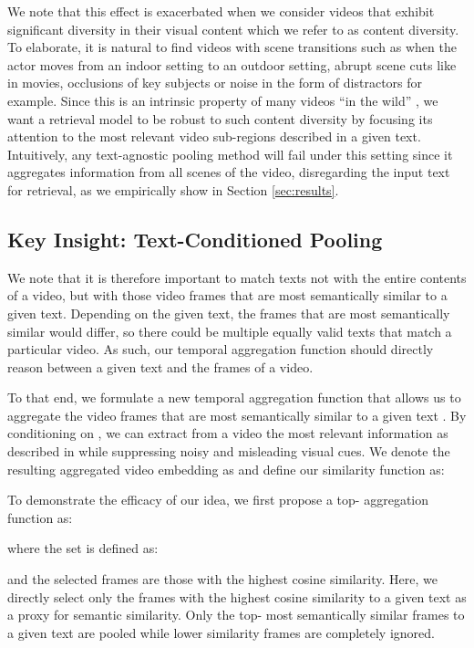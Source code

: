 \documentclass[10pt,twocolumn,letterpaper]{article}
\begin{document}
We note that this effect is exacerbated when we consider videos that exhibit significant diversity in their visual content \cite{liu2009recognizing} which we refer to as content diversity. To elaborate, it is natural to find videos with scene transitions such as when the actor moves from an indoor setting to an outdoor setting, abrupt scene cuts like in movies, occlusions of key subjects or noise in the form of distractors for example. Since this is an intrinsic property of many videos ``in the wild'' \cite{soomro2012ucf101, li2019quality}, we want a retrieval model to be robust to such content diversity by focusing its attention to the most relevant video sub-regions described in a given text. Intuitively, any text-agnostic pooling method will fail under this setting since it aggregates information from all scenes of the video, disregarding the input text for retrieval, as we empirically show in Section \ref{sec:results}.


\subsection{Key Insight: Text-Conditioned Pooling}
\label{sec:text-cond-pool}
We note that it is therefore important to match texts not with the entire contents of a video, but with those video frames that are most semantically similar to a given text. Depending on the given text, the frames that are most semantically similar would differ, so there could be multiple equally valid texts that match a particular video. As such, our temporal aggregation function should directly reason between a given text and the frames of a video.

To that end, we formulate a new temporal aggregation function  that allows us to aggregate the video frames that are most semantically similar to a given text . By conditioning  on , we can extract from a video  the most relevant information as described in  while suppressing noisy and misleading visual cues. We denote the resulting aggregated video embedding as  and define our similarity function  as:






To demonstrate the efficacy of our idea, we first propose a top- aggregation function  as:

where the set  is defined as:
 
and the selected frames are those with the highest cosine similarity. Here, we directly select only the frames with the highest cosine similarity to a given text as a proxy for semantic similarity. Only the top- most semantically similar frames to a given text are pooled while lower similarity frames are completely ignored.
\end{document}
